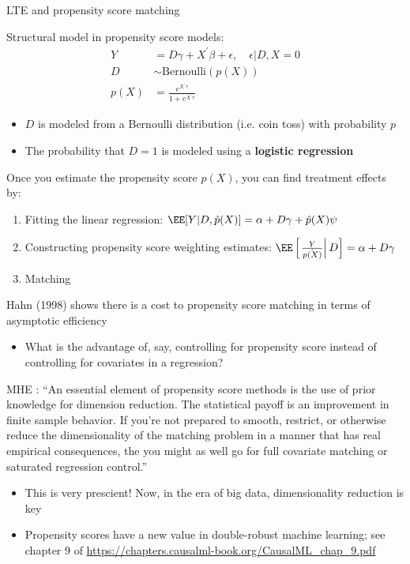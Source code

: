 \documentclass[compress, 8pt]{beamer}
\begin{document}
\begin{frame}{LTE and propensity score matching}

Structural model in propensity score models:
\begin{align*}
    Y &= D \gamma + X^\prime \beta + \epsilon, \quad \epsilon \vert D, X = 0 \\
    D &\sim \text{Bernoulli}\left( p(X) \right) \\
    p(X) &= \frac{e^{X^\prime \tau}}{1 + e^{X^\prime \tau}}
\end{align*}
\begin{itemize}
    \item $D$ is modeled from a Bernoulli distribution (i.e. coin toss) with probability $p$
    \item The probability that $D=1$ is modeled using a \textbf{logistic regression}
\end{itemize}
Once you estimate the propensity score $p(X)$, you can find treatment effects by:
\begin{enumerate}
    \item Fitting the linear regression: $\EE [Y \vert D, \hat{p} (X)] = \alpha + D \gamma + \hat{p}(X) \psi$
    \item Constructing propensity score weighting estimates: $\EE \left[ \left. \frac{Y}{\hat{p(X)}} \right\vert D \right] = \alpha + D \gamma$ 
    \item Matching 
\end{enumerate}

\end{frame}

\begin{frame}{}

Hahn (1998) shows there is a cost to propensity score matching in terms of asymptotic efficiency
\begin{itemize}
    \item What is the advantage of, say, controlling for propensity score instead of controlling for covariates in a regression?
\end{itemize}

\vspace{2ex}
MHE : ``An essential element of  propensity score methods is the use of prior knowledge for dimension reduction. The statistical payoff is an improvement in finite sample behavior. If you're not prepared to smooth, restrict, or otherwise reduce the dimensionality of the matching problem in a manner that has real empirical consequences, the you might as well go for full covariate matching or saturated regression control.''
\begin{itemize}
    \item This is very prescient! Now, in the era of big data, dimensionality reduction is key
    \item Propensity scores have a new value in double-robust machine learning; see chapter 9 of \url{https://chapters.causalml-book.org/CausalML_chap_9.pdf}
\end{itemize}

\end{frame}
\end{document}
